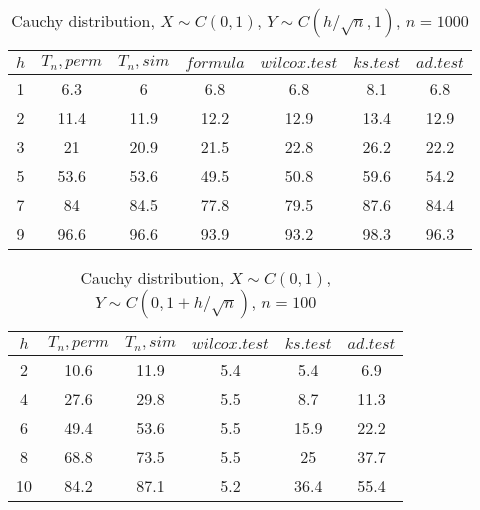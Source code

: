 \documentclass{svproc}
\begin{document}
\begin{table}[h!]
  \caption{Cauchy distribution, $X\sim C(0,1)$, $Y\sim C(h/\sqrt{n},1)$, $n=1000$}
  \begin{center}
  \begin{tabular}{c@{\quad}c@{\quad}c@{\quad}c@{\quad}c@{\quad}c@{\quad}c}
  \hline
  $h$  & $T_n, perm$ & $T_n, sim$ & $formula$ & $wilcox.test$ & $ks.test$ & $ad.test$ \\
  \hline
  1 & 6.3 & 6 & 6.8 & 6.8 & 8.1 & 6.8\\
  2 & 11.4 & 11.9 & 12.2 & 12.9 & 13.4 & 12.9 \\
  3 & 21 & 20.9 & 21.5 & 22.8 & 26.2 & 22.2 \\
  5 & 53.6 & 53.6 & 49.5 & 50.8 & 59.6 & 54.2 \\
  7 & 84 & 84.5 & 77.8 & 79.5 & 87.6 & 84.4 \\
  9 & 96.6 & 96.6 & 93.9 & 93.2 & 98.3 & 96.3 \\
  \hline
  \end{tabular}
  \end{center}
\end{table}

\begin{table}
  \caption{Cauchy distribution, $X\sim C(0,1)$, $Y\sim C(0, 1 + h/\sqrt{n})$, $n=100$}
  \begin{center}
  \begin{tabular}{c@{\quad}c@{\quad}c@{\quad}c@{\quad}c@{\quad}c}
  \hline
  $h$ & $T_n, perm$ & $T_n, sim$ & $wilcox.test$ & $ks.test$ & $ad.test$ \\
  \hline
  2 & 10.6 & 11.9 & 5.4 & 5.4 & 6.9 \\
  4 & 27.6 & 29.8 & 5.5 & 8.7 & 11.3 \\
  6 & 49.4 & 53.6 & 5.5 & 15.9 & 22.2 \\
  8 & 68.8 & 73.5 & 5.5 & 25 & 37.7 \\
  10 & 84.2 & 87.1 & 5.2 & 36.4 & 55.4 \\
  \hline
  \end{tabular}
  \end{center}
\end{table}
\end{document}
